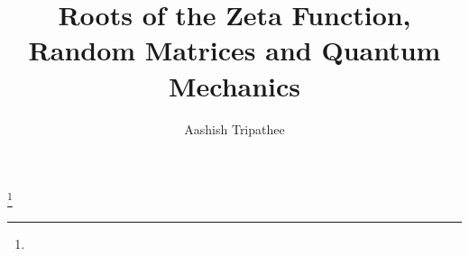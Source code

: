 \documentclass{amsproc}
\theoremstyle{definition}
\theoremstyle{remark}
\numberwithin{equation}{section}
\begin{document}
\title{Roots of the Zeta Function, Random Matrices and Quantum Mechanics}


\author{Aashish Tripathee}
\address{}
\curraddr{}
\thanks{}





\date{}

\begin{abstract}
\end{abstract}



\maketitle





\end{document}
